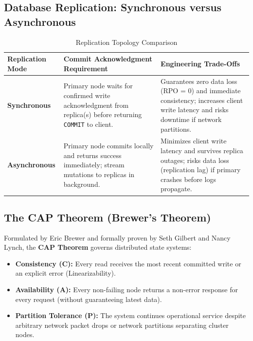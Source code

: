 \subsection{Database Replication: Synchronous versus Asynchronous}
\begin{table}[htbp]
\centering
\small
\caption{Replication Topology Comparison}
\label{tab:replication_comparison}
\begin{tabularx}{\textwidth}{p{3.2cm} X X}
\toprule
\textbf{Replication Mode} & \textbf{Commit Acknowledgment Requirement} & \textbf{Engineering Trade-Offs} \\
\midrule
\textbf{Synchronous} & Primary node waits for confirmed write acknowledgment from replica(s) before returning \texttt{COMMIT} to client. & Guarantees zero data loss (RPO = 0) and immediate consistency; increases client write latency and risks downtime if network partitions. \\
\textbf{Asynchronous} & Primary node commits locally and returns success immediately; stream mutations to replicas in background. & Minimizes client write latency and survives replica outages; risks data loss (replication lag) if primary crashes before logs propagate. \\
\bottomrule
\end{tabularx}
\end{table}

\subsection{The CAP Theorem (Brewer's Theorem)}
Formulated by Eric Brewer and formally proven by Seth Gilbert and Nancy Lynch, the \textbf{CAP Theorem} governs distributed state systems:
\begin{itemize}
    \item \textbf{Consistency (C):} Every read receives the most recent committed write or an explicit error (Linearizability).
    \item \textbf{Availability (A):} Every non-failing node returns a non-error response for every request (without guaranteeing latest data).
    \item \textbf{Partition Tolerance (P):} The system continues operational service despite arbitrary network packet drops or network partitions separating cluster nodes.
\end{itemize}

